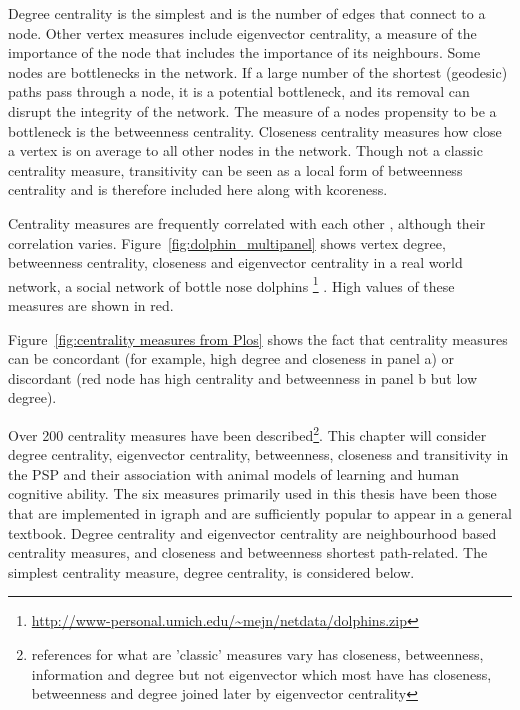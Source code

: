 Degree centrality is the simplest and is the number of edges that connect to a node. Other vertex measures include eigenvector centrality, a measure of the importance of the node that includes the importance of its neighbours\cite{bonacich1987power}.  Some nodes are bottlenecks in the network. If a large number of the shortest (geodesic) paths pass through a node, it is a potential bottleneck, and its removal can disrupt the integrity of the network. The measure of a nodes propensity to be a bottleneck is the betweenness centrality\cite{freeman1977set}. Closeness centrality measures how close a vertex is on average to all other nodes in the network. Though not a classic centrality measure, transitivity can be seen as a local form of betweenness centrality \cite{newman2018networks} and is therefore included here along with kcoreness. 

 Centrality measures are frequently correlated with each other \cite{valente2008correlated}, although their correlation varies\cite{oldham2019consistency}. Figure~\ref{fig:dolphin_multipanel} shows vertex degree, betweenness centrality, closeness and eigenvector centrality in a real world network, a social network of bottle nose dolphins \footnote{\url{http://www-personal.umich.edu/~mejn/netdata/dolphins.zip}} \cite{lusseau2003bottlenose}. High values of these measures are shown in red. 

Figure~\ref{fig:centrality measures from Plos} shows the fact that centrality measures can be concordant (for example, high degree and closeness in panel a) or discordant (red node has high centrality and betweenness in panel b but low degree). 







Over 200 centrality measures have been described\cite{jalili2015centiserver}\footnote{references for what are 'classic' measures vary \cite{cadini2008using} has closeness, betweenness, information and degree but not eigenvector which most have \cite{brandes2016maintaining} has closeness, betweenness and degree joined later by eigenvector centrality}. This chapter will consider degree centrality, eigenvector centrality, betweenness, closeness and transitivity in the PSP and their association with animal models of learning and human cognitive ability. The six measures primarily used in this thesis have been those that are implemented in igraph and are sufficiently popular to appear in a general textbook\cite{newman2018networks}. Degree centrality and eigenvector centrality are neighbourhood based centrality measures, and closeness and betweenness shortest path-related\cite{kardos2020stability}. The simplest centrality measure, degree centrality, \cite{newman2018networks} is considered below. 

